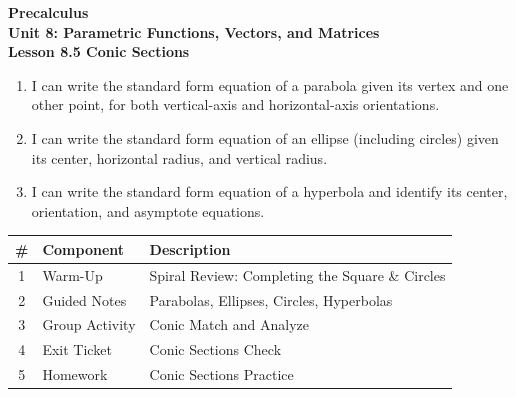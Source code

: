 \documentclass[10pt]{article}
\begin{document}
\vspace{-0.8in}

\begin{center}
  {\color{white}\textbf{\LARGE Precalculus}}\\[4pt]
  {\color{skymid}\large\textbf{Unit 8: Parametric Functions, Vectors, and Matrices}}\\[6pt]
  {\color{white}\textbf{\large Lesson 8.5 \quad Conic Sections}}
\end{center}

\vspace{0.22in}
\namedateperiod
\vspace{0.18in}

\begin{learningtargetbox}
\small
\begin{enumerate}[leftmargin=1.5em, itemsep=5pt]
  \item I can write the standard form equation of a parabola given its vertex
    and one other point, for both vertical-axis and horizontal-axis orientations.
  \item I can write the standard form equation of an ellipse (including circles)
    given its center, horizontal radius, and vertical radius.
  \item I can write the standard form equation of a hyperbola and identify its
    center, orientation, and asymptote equations.
\end{enumerate}
\end{learningtargetbox}

\vspace{0.14in}

\begin{tocbox}
\small
\renewcommand{\arraystretch}{1.5}
\begin{tabularx}{\linewidth}{@{} c l X @{}}
\rowcolor{sky}
\textbf{\#} & \textbf{Component} & \textbf{Description} \\
\midrule
1 & Warm-Up        & Spiral Review: Completing the Square \& Circles \\
2 & Guided Notes   & Parabolas, Ellipses, Circles, Hyperbolas \\
3 & Group Activity & Conic Match and Analyze \\
4 & Exit Ticket    & Conic Sections Check \\
5 & Homework       & Conic Sections Practice \\
\end{tabularx}
\end{tocbox}
\end{document}
